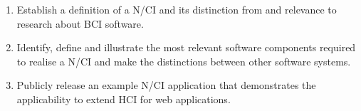 \begin{enumerate}
  \item Establish a definition of a N/CI and its distinction from and relevance to research about BCI software.
  \item Identify, define and illustrate the most relevant software components required to realise a N/CI and make the distinctions between other software systems.
  \item Publicly release an example N/CI application that demonstrates the applicability to extend HCI for web applications.
\end{enumerate}

